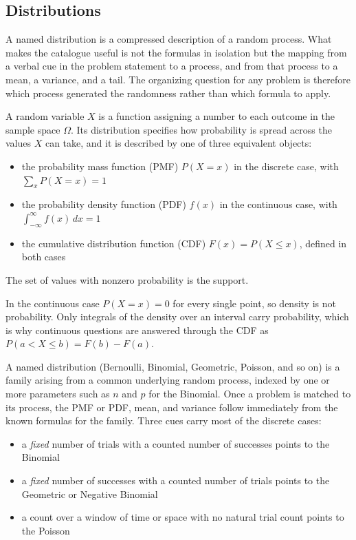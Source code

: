 \subsection{Distributions}

A named distribution is a compressed description of a random process. What makes the catalogue useful is not the formulas in isolation but the mapping from a verbal cue in the problem statement to a process, and from that process to a mean, a variance, and a tail. The organizing question for any problem is therefore which process generated the randomness rather than which formula to apply.

\begin{definition}
A random variable $X$ is a function assigning a number to each outcome in the sample space $\Omega$. Its distribution specifies how probability is spread across the values $X$ can take, and it is described by one of three equivalent objects:
\begin{itemize}[itemsep=-1ex, label=--]
  \item the probability mass function (PMF) $P(X = x)$ in the discrete case, with $\sum_x P(X=x) = 1$
  \item the probability density function (PDF) $f(x)$ in the continuous case, with $\int_{-\infty}^{\infty} f(x)\,dx = 1$
  \item the cumulative distribution function (CDF) $F(x) = P(X \leq x)$, defined in both cases
\end{itemize}
The set of values with nonzero probability is the support.
\end{definition}

In the continuous case $P(X = x) = 0$ for every single point, so density is not probability. Only integrals of the density over an interval carry probability, which is why continuous questions are answered through the CDF as $P(a < X \leq b) = F(b) - F(a)$.

\vspace{1em}

\begin{keybox}
A named distribution (Bernoulli, Binomial, Geometric, Poisson, and so on) is a family arising from a common underlying random process, indexed by one or more parameters such as $n$ and $p$ for the Binomial. Once a problem is matched to its process, the PMF or PDF, mean, and variance follow immediately from the known formulas for the family. Three cues carry most of the discrete cases:
\begin{itemize}[itemsep=0.5ex, label=--]
  \item a \textit{fixed} number of trials with a counted number of successes points to the Binomial
  \item a \textit{fixed} number of successes with a counted number of trials points to the Geometric or Negative Binomial
  \item a count over a window of time or space with no natural trial count points to the Poisson
\end{itemize}
\end{keybox}


